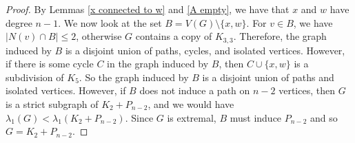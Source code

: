 \begin{proof}
By Lemmas \ref{x connected to w} and \ref{A empty}, we have that $x$ and $w$ have degree $n-1$. We now look at the set $B = V(G) \setminus \{x,w\}$. For $v\in B$, we have $|N(v) \cap B| \leq 2$, otherwise $G$ contains a copy of $K_{3,3}$. Therefore, the graph induced by $B$ is a disjoint union of paths, cycles, and isolated vertices. However, if there is some cycle $C$ in the graph induced by $B$, then $C \cup\{x,w\}$ is a subdivision of $K_5$. So the graph induced by $B$ is a disjoint union of paths and isolated vertices. However, if $B$ does not induce a path on $n-2$ vertices, then $G$ is a strict subgraph of $K_2 + P_{n-2}$, and we would have $\lambda_1(G) < \lambda_1(K_2 + P_{n-2})$. Since $G$ is extremal, $B$ must induce $P_{n-2}$ and so $G = K_2 + P_{n-2}$.
\end{proof}


